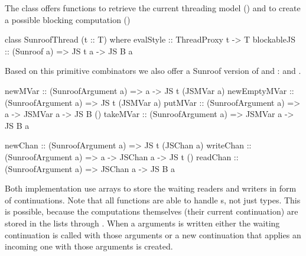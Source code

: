 The class  offers functions to retrieve the 
current threading model () and to create a possible
blocking computation ()
\begin{Code}
class SunroofThread (t :: T) where
  evalStyle    :: ThreadProxy t -> T
  blockableJS :: (Sunroof a) => JS t a -> JS B a
\end{Code}
Based on this primitive combinators we also offer a Sunroof 
version of  and :  and .
\begin{Code}
newMVar      :: (SunroofArgument a) => a -> JS t (JSMVar a)
newEmptyMVar :: (SunroofArgument a) => JS t (JSMVar a)
putMVar      :: (SunroofArgument a) => a -> JSMVar a -> JS B ()
takeMVar     :: (SunroofArgument a) => JSMVar a -> JS B a

newChan   :: (SunroofArgument a) => JS t (JSChan a)
writeChan :: (SunroofArgument a) => a -> JSChan a -> JS t ()
readChan  :: (SunroofArgument a) => JSChan a -> JS B a
\end{Code}
Both implementation use arrays to store the waiting readers and
writers in form of continuations. Note that all functions
are able to handle s, not just 
types. This is possible, because the computations themselves
(their current continuation) are
stored in the lists through .
When a arguments is written either the waiting
continuation is called with those arguments or a new continuation 
that applies an incoming one with those arguments is created.

